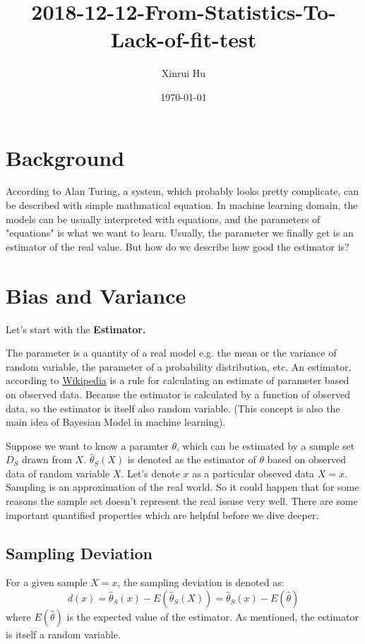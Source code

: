 \documentclass[11pt]{article}
\author{Xinrui Hu}
\date{\today}
\title{2018-12-12-From-Statistics-To-Lack-of-fit-test}
\begin{document}
\maketitle
\tableofcontents

\section{Background}
\label{sec-1}
According to Alan Turing, a system, which probably looks pretty complicate, can be described with simple mathmatical equation. In machine learning domain, the models can be usually interpreted with equations, and the parameters of "equations" is what we want to learn. Usually, the parameter we finally get is an estimator of the real value. But how do we describe how good the estimator is?

\section{Bias and Variance}
\label{sec-2}

Let's start with the \textbf{Estimator.}

The parameter is a quantity of a real model e.g. the mean or the variance of random variable, the parameter of a probability distribution, etc. An estimator, according to \href{https://en.wikipedia.org/wiki/Estimator}{Wikipedia} is a rule for calculating an estimate of parameter based on observed data. Because the estimator is calculated by a function of observed data, so the estimator is itself also random variable. (This concept is also the main idea of Bayesian Model in machine learning).

Suppose we want to know a paramter $\theta$, which can be estimated by a sample set $D_{S}$ drawn from $X$. $\hat{\theta}_S(X)$ is denoted as the estimator of $\theta$ based on observed data of random variable $X$. Let's denote $x$ as a particular obseved data $X=x$. Sampling is an approximation of the real world. So it could happen that for some reasons the sample set doesn't represent the real issuse very well. There are some important quantified properties which are helpful before we dive deeper.

\subsection{Sampling Deviation}
\label{sec-2-1}
For a given sample $X=x$, the sampling deviation is denoted as:
\begin{equation}
d(x) = \hat{\theta}_S(x)-E(\hat{\theta}_S(X)) = \hat{\theta}_S(x) - E(\hat{\theta})
\end{equation}
where $E(\hat{\theta})$ is the expected value of the estimator. As mentioned, the estimator is itself a random variable.
\end{document}
